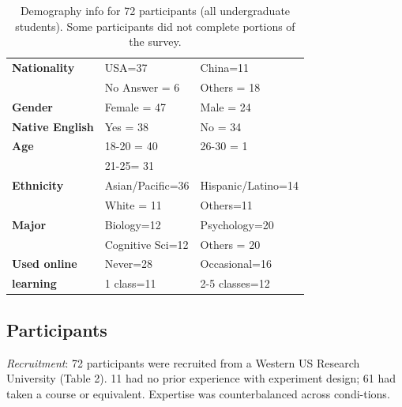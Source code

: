 \vspace{0.25in}
\begin{table}[!ht]
\caption[Demography info for 72 participants (all undergraduate students)] 
{Demography info for 72 participants (all undergraduate students). Some participants did not complete portions of the survey.}

\vspace{-0.25in}
\begin{center}
\begin{tabular}{|>{\bf}p{1in}|p{1.5in}|p{1.5in}|}
\hline
Nationality	&	USA=37		&	China=11\\
			&	No Answer = 6	&	Others = 18\\
Gender		&	Female = 47	&	Male = 24\\
Native English	&	Yes = 38 		&	No = 34\\
Age			&	18-20 = 40	& 	26-30 = 1\\
			&	21-25= 31	&			\\
Ethnicity		&	Asian/Pacific=36 & 	Hispanic/Latino=14\\
			&	White = 11		&	Others=11 \\
Major		&	Biology=12	& 	Psychology=20 \\
			&	Cognitive Sci=12 &	 Others = 20 \\
Used online	& 	Never=28		&	Occasional=16\\
learning		&	1 class=11	&	2-5 classes=12\\
\hline
\end{tabular}
\end{center}
\label{tab:gi-results1}
\end{table}


\subsection{Participants}
\textit{Recruitment}: 72 participants were recruited from a Western US Research University (Table 2). 11 had no prior experience with experiment design; 61 had taken a course or equivalent. Expertise was counterbalanced across condi-tions.   

